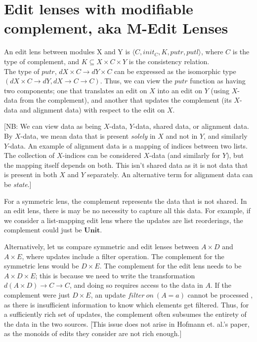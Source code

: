 \documentclass[a4paper,10pt]{article}
\title{}
\author{}
\newcommand{\Unit}{\ensuremath{\mathbf{Unit}}}
\begin{document}
\maketitle

\section{Edit lenses with modifiable complement, aka M-Edit Lenses}
An edit lens between modules X and Y is $\langle C, init_C, K, putr, putl \rangle$, where $C$ is the type of complement, and $K \subseteq X \times C \times Y$ is the consistency relation. \\
The type of $putr$, $dX \times C \to dY \times C$ can be expressed as the isomorphic type $(dX \times C \to dY, dX \to C \to C)$. Thus, we can view the $putr$ function as having two components; one that translates an edit on $X$ into an edit on $Y$ (using $X$-data from the complement), and another that updates the complement (its $X$-data and alignment data) with respect to the edit on $X$.

[NB: We can view data as being $X$-data, $Y$-data, shared data, or alignment data. By $X$-data, we mean data that is present \emph{solely} in $X$ and not in $Y$, and similarly $Y$-data. An example of alignment data is a mapping of indices between two lists. The collection of $X$-indices can be considered $X$-data (and similarly for $Y$), but the mapping itself depends on both. This isn't shared data as it is not data that is present in both $X$ and $Y$ separately. An alternative term for alignment data can be \emph{state}.]

For a symmetric lens, the complement represents the data that is not shared. In an edit lens, there is may be no necessity to capture all this data. For example, if we consider a list-mapping edit lens where the updates are list reorderings, the complement could just be \Unit. 

Alternatively, let us compare symmetric and edit lenses between $A \times D$ and $A \times E$, where updates include a filter operation. The complement for the symmetric lens would be $D \times E$. 
The complement for the edit lens needs to be $A \times D \times E$; this is because we need to write the transformation $d(A \times D) \to C \to C$, and doing so requires access to the data in $A$. If the complement were just $D \times E$, an update $filter~on~(A=a)$ cannot be processed , as there is insufficient information to know which elements get filtered.
Thus, for a sufficiently rich set of updates, the complement often subsumes the entirety of the data in the two sources.
[This issue does not arise in Hofmann et. al.'s paper, as the monoids of edits they consider are not rich enough.]
\end{document}
